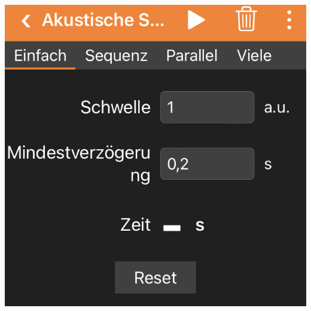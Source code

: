 \documentclass[../main.tex]{subfiles}
\begin{document}
\begin{tcolorbox}
\begin{minipage}[]{0.75\textwidth}
\begin{minipage}[]{0.20\textwidth}
            \vspace{0.1cm}
            \includegraphics[width=1\textwidth]{img/app1}
        \end{minipage}


\end{minipage}
\end{tcolorbox}
\end{document}
